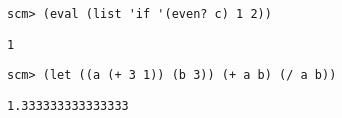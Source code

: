 \begin{blocksection}
\begin{comment}
	\begin{lstlisting}
	scm> (eval '(cons 1 nil))
	\end{lstlisting}
	\begin{solution}[0.25in]
	\begin{lstlisting}
	(1)
	\end{lstlisting}
	\end{solution}
\end{comment}
	
\begin{lstlisting}
scm> (eval (list 'if '(even? c) 1 2))
\end{lstlisting}
\begin{solution}[0.25in]
\begin{lstlisting}
1
\end{lstlisting}
\end{solution}
	
\begin{lstlisting}
scm> (let ((a (+ 3 1)) (b 3)) (+ a b) (/ a b))
\end{lstlisting}
\begin{solution}[0.25in]
\begin{lstlisting}
1.333333333333333
\end{lstlisting}
\end{solution}
\end{blocksection}
	
